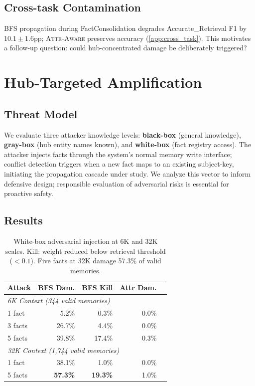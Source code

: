 \documentclass{article}
\newcommand{\attraware}{\textsc{Attr-Aware}}
\begin{document}
\subsection{Cross-task Contamination}

BFS propagation during FactConsolidation degrades Accurate\_Retrieval F1 by $10.1\pm1.6$pp; \attraware{} preserves accuracy (\cref{app:cross_task}).
This motivates a follow-up question: could hub-concentrated damage be deliberately triggered?


\section{Hub-Targeted Amplification}
\label{sec:c3}

\subsection{Threat Model}

We evaluate three attacker knowledge levels: \textbf{black-box} (general knowledge), \textbf{gray-box} (hub entity names known), and \textbf{white-box} (fact registry access).
The attacker injects facts through the system's normal memory write interface; conflict detection triggers when a new fact maps to an existing subject-key, initiating the propagation cascade under study.
We analyze this vector to inform defensive design; responsible evaluation of adversarial risks is essential for proactive safety.

\subsection{Results}

\begin{table}[htbp]
\centering
\footnotesize
\begin{tabular}{lrrrr}
\toprule
\textbf{Attack} & \textbf{BFS Dam.} & \textbf{BFS Kill} & \textbf{Attr Dam.} \\
\midrule
\multicolumn{4}{l}{\textit{6K Context (344 valid memories)}} \\
1 fact & 5.2\% & 0.3\% & 0.0\% \\
3 facts & 26.7\% & 4.4\% & 0.0\% \\
5 facts & 39.8\% & 17.4\% & 0.3\% \\
\midrule
\multicolumn{4}{l}{\textit{32K Context (1,744 valid memories)}} \\
1 fact & 38.1\% & 1.0\% & 0.0\% \\
5 facts & \textbf{57.3\%} & \textbf{19.3\%} & 1.0\% \\
\bottomrule
\end{tabular}
\caption{White-box adversarial injection at 6K and 32K scales. Kill: weight reduced below retrieval threshold ($< 0.1$). Five facts at 32K damage 57.3\% of valid memories.}
\label{tab:adversarial}
\end{table}
\end{document}
